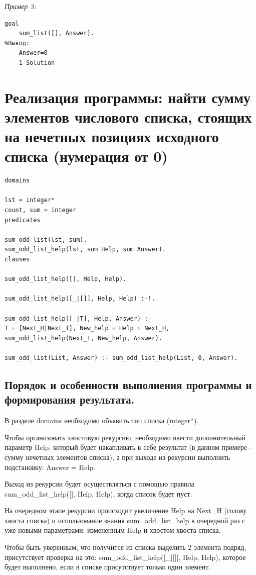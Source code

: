\documentclass[a4paper,12pt]{article}
\begin{document}
\textit{Пример 3:}

\begin{verbatim}
goal
	sum_list([], Answer).
%Вывод:
	Answer=0
	1 Solution
\end{verbatim}

\newpage

\section*{Реализация программы: найти сумму элементов числового списка, стоящих на нечетных позициях исходного списка (нумерация от 0)}

\begin{verbatim}
domains

lst = integer*
count, sum = integer
predicates

sum_odd_list(lst, sum).
sum_odd_list_help(lst, sum Help, sum Answer).
clauses

sum_odd_list_help([], Help, Help).

sum_odd_list_help([_|[]], Help, Help) :-!.

sum_odd_list_help([_|T], Help, Answer) :-
T = [Next_H|Next_T], New_help = Help + Next_H, 
sum_odd_list_help(Next_T, New_help, Answer).

sum_odd_list(List, Answer) :- sum_odd_list_help(List, 0, Answer).
\end{verbatim}

\subsection*{Порядок и особенности выполнения программы и формирования результата.}

В разделе domains необходимо объявить тип списка (integer*).

Чтобы организовать хвостовую рекурсию, необходимо ввести дополнительный параметр Help, который будет накапливать в себе результат (в данном примере - сумму нечетных элементов списка), а при выходе из рекурсии выполнить подстановку: Answer = Help.

Выход из рекурсии будет осуществляться с помошью правила sum\_odd\_list\_help([], Help, Help), когда список будет пуст.

На очередном этапе рекурсии происходит увеличение Help на Next\_H (голову хвоста списка) и использование знания sum\_odd\_list\_help в очередной раз с уже новыми параметрами: измененным Help и хвостом хвоста списка.

Чтобы быть уверенным, что получится из списка выделить 2 элемента подряд, присутствует проверка на это: sum\_odd\_list\_help([\_|[]], Help, Help), которое будет выполнено, если в списке присутствует только один элемент.
\end{document}

